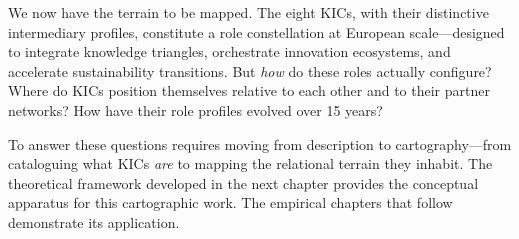 \documentclass[../main.tex]{subfiles}
\begin{document}
\vspace{1em}

We now have the terrain to be mapped. The eight KICs, with their distinctive intermediary profiles, constitute a role constellation at European scale---designed to integrate knowledge triangles, orchestrate innovation ecosystems, and accelerate sustainability transitions. But \emph{how} do these roles actually configure? Where do KICs position themselves relative to each other and to their partner networks? How have their role profiles evolved over 15 years?

To answer these questions requires moving from description to cartography---from cataloguing what KICs \emph{are} to mapping the relational terrain they inhabit. The theoretical framework developed in the next chapter provides the conceptual apparatus for this cartographic work. The empirical chapters that follow demonstrate its application.

\vspace{1cm}

\begin{center}
\end{center}

\closeintermezzo
\end{document}

